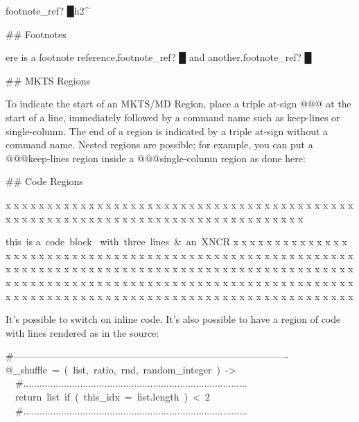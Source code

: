\begin{multicols}{2}{\mktsStyleBold\color{violet}{\mktsStyleSymbol}footnote\_ref? {\mktsStyleSymbol█}}h2\textasciicircum{}\mktsShowpar\par
\#\# Footnotes\mktsShowpar\par
ere is a footnote reference,{\mktsStyleBold\color{violet}{\mktsStyleSymbol}footnote\_ref? {\mktsStyleSymbol█}} and another.{\mktsStyleBold\color{violet}{\mktsStyleSymbol}footnote\_ref? {\mktsStyleSymbol█}}\mktsShowpar\par
\#\# MKTS Regions \mktsShowpar\par
To indicate the start of an {\mktsStyleBold{}MKTS}/MD Region, place a triple at-sign {\mktsStyleCode{}@@@}
at the start of a line, immediately followed by a command name such as
{\mktsStyleCode{}keep-lines} or {\mktsStyleCode{}single-column}. The end of a region is indicated by a
triple at-sign without a command name. Nested regions are possible; for example,
you can put a {\mktsStyleCode{}@@@keep-lines} region inside a {\mktsStyleCode{}@@@single-column} region as
done here:\mktsShowpar\par
\#\# Code Regions\mktsShowpar\par
x x x x x x x x x x x x x x x x x x x x x x x x x x
x x x x x x x x x x x x x x x x x x x x x x x x x x
x x x x x x x x x x x x x x x x x x x x x x x x x x\mktsShowpar\par
\begingroup\obeyalllines\mktsStyleCode{}this is
a code block 
with three lines \& an XNCR
\endgroup{}x x x x x x x x x x x x x x x x x x x x x x x x x x
x x x x x x x x x x x x x x x x x x x x x x x x x x
x x x x x x x x x x x x x x x x x x x x x x x x x x
x x x x x x x x x x x x x x x x x x x x x x x x x x
x x x x x x x x x x x x x x x x x x x x x x x x x x
x x x x x x x x x x x x x x x x x x x x x x x x x x
x x x x x x x x x x x x x x x x x x x x x x x x x x\mktsShowpar\par
It’s possible to switch on {\mktsStyleCode{}inline code}. It’s also possible
to have a region of code with lines rendered as in the source:
\mktsShowpar\par
\end{multicols}\begingroup\obeyalllines\mktsStyleCode{}\#-------------------------------------------------------------------------------------
@\_shuffle = ( list, ratio, rnd, random\_integer ) ->
  \#...................................................................................
  return list if ( this\_idx = list.length ) < 2
  \#...................................................................................
